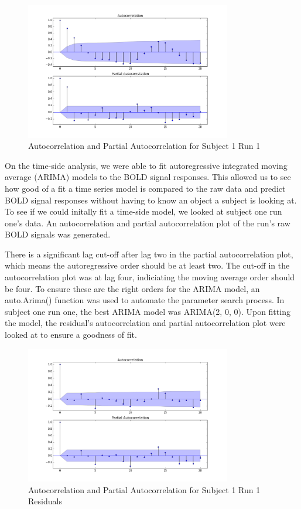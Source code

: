 \documentclass[11pt,twocolumn]{article}
\begin{document}
\begin{figure}[h!]                                                              
\centering                                                                      
\includegraphics[width=90mm]{sub001_run001_corrFunc.png}                   
\caption{Autocorrelation and Partial Autocorrelation for Subject 1 Run 1}                                    
\end{figure}


On the time-side analysis, we were able to fit autoregressive integrated
moving average (ARIMA) models to the BOLD signal responses. This allowed us to
see how good of a fit a time series model is compared to the raw data and 
predict BOLD signal responses without having to know an object a subject is 
looking at. To see if we could initally fit a time-side model, we looked at
subject one run one's data. An autocorrelation and partial autocorrelation 
plot of the run's raw BOLD signals was generated. 

There is a significant lag cut-off after lag two in the partial autocorrelation plot, 
which means the autoregressive order should be at least two. The cut-off in 
the autocorrelation plot was at lag four, indiciating the moving average 
order should be four. To ensure these are the right orders for the ARIMA model, 
an auto.Arima() function was used to automate the parameter search process. 
In subject one run one, the best ARIMA model was ARIMA(2, 0, 0). 
Upon fitting the model, the residual's autocorrelation and partial 
autocorrelation plot were looked at to ensure a goodness of fit. 

\begin{figure}[h!]                                                              
\centering                                                                      
\includegraphics[width=90mm]{sub001_run001_residcorrFunc.png}                   
\caption{Autocorrelation and Partial Autocorrelation for Subject 1 Run 1 Residuals}                                    
\end{figure}
\end{document}
